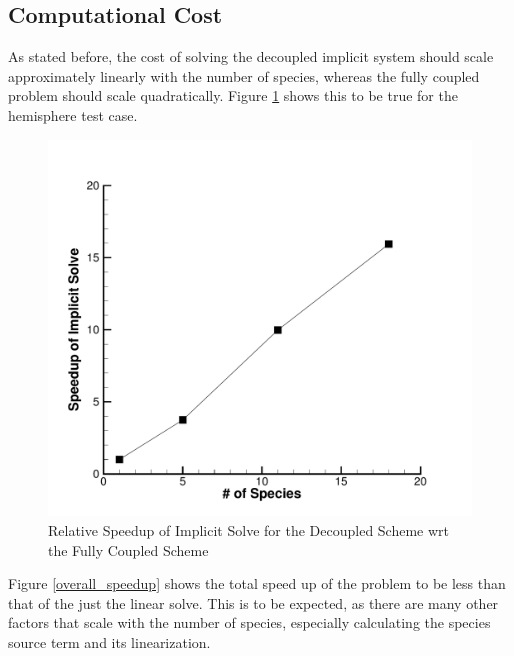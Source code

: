 \documentclass[]{aiaa-tc}%
\begin{document}
\subsection{Computational Cost}

As stated before, the cost of solving the decoupled implicit system should scale approximately linearly with the number of species, whereas the fully coupled problem should scale quadratically.  Figure \ref{lsolve_speedup} shows this to be true for the hemisphere test case.
%
\begin{figure}
\begin{center}
\includegraphics{linear_solve_speedup}
\caption{Relative Speedup of Implicit Solve for the Decoupled Scheme wrt the Fully Coupled Scheme}
\label{lsolve_speedup}
\end{center}
\end{figure}
%
Figure \ref{overall_speedup} shows the total speed up of the problem to be less than that of the just the linear solve.   This is to be expected, as there are many other factors that scale with the number of species, especially calculating the species source term and its linearization.
%
\end{document}
